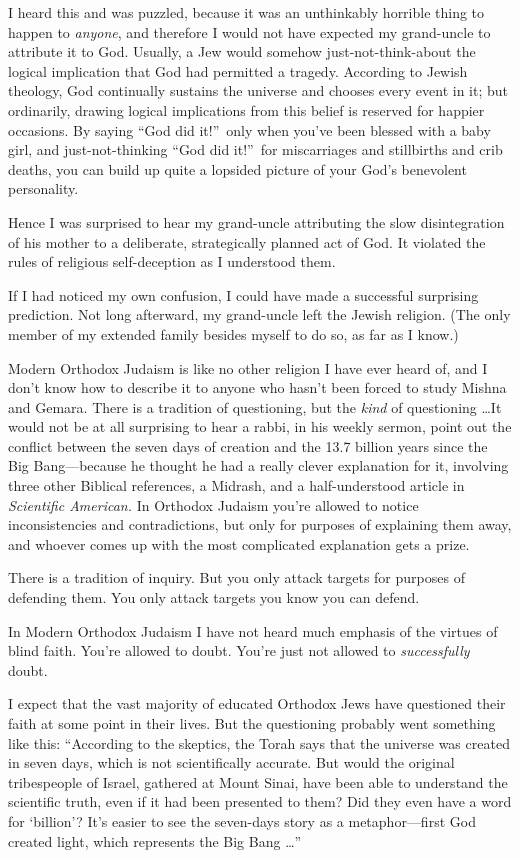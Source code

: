 {
 I heard this and was puzzled, because it was an unthinkably
horrible thing to happen to \textit{anyone}, and therefore I would not
have expected my grand-uncle to attribute it to God. Usually, a Jew
would somehow just-not-think-about the logical implication that God had
permitted a tragedy. According to Jewish theology, God continually
sustains the universe and chooses every event in it; but ordinarily,
drawing logical implications from this belief is reserved for happier
occasions. By saying ``God did it!''~only when you've been blessed with a baby girl, and
just-not-thinking ``God did it!''~for miscarriages and stillbirths and crib deaths, you can build up
quite a lopsided picture of your God's benevolent
personality.}

{
 Hence I was surprised to hear my grand-uncle attributing the slow
disintegration of his mother to a deliberate, strategically planned act
of God. It violated the rules of religious self-deception as I
understood them.}

{
 If I had noticed my own confusion, I could have made a successful
surprising prediction. Not long afterward, my grand-uncle left the
Jewish religion. (The only member of my extended family besides myself
to do so, as far as I know.)}

{
 Modern Orthodox Judaism is like no other religion I have ever
heard of, and I don't know how to describe it to anyone
who hasn't been forced to study Mishna and Gemara.
There is a tradition of questioning, but the \textit{kind} of
questioning \ldots It would not be at all surprising to hear a rabbi, in
his weekly sermon, point out the conflict between the seven days of
creation and the 13.7 billion years since the Big Bang---because he
thought he had a really clever explanation for it, involving three
other Biblical references, a Midrash, and a half-understood article in
\textit{Scientific American.} In Orthodox Judaism
you're allowed to notice inconsistencies and
contradictions, but only for purposes of explaining them away, and
whoever comes up with the most complicated explanation gets a prize.}

{
 There is a tradition of inquiry. But you only attack targets for
purposes of defending them. You only attack targets you know you can
defend.}

{
 In Modern Orthodox Judaism I have not heard much emphasis of the
virtues of blind faith. You're allowed to doubt.
You're just not allowed to \textit{successfully}
doubt.}

{
 I expect that the vast majority of educated Orthodox Jews have
questioned their faith at some point in their lives. But the
questioning probably went something like this:
``According to the skeptics, the Torah says that the
universe was created in seven days, which is not scientifically
accurate. But would the original tribespeople of Israel, gathered at
Mount Sinai, have been able to understand the scientific truth, even if
it had been presented to them? Did they even have a word for
`billion'? It's easier
to see the seven-days story as a metaphor---first God created light,
which represents the Big Bang \ldots''}

